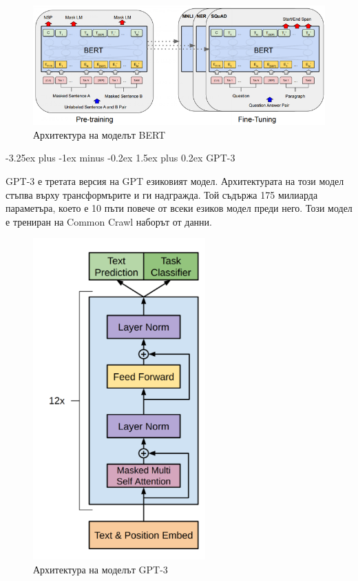 \documentclass{article}
\makeatletter
\renewcommand\paragraph{\@startsection{paragraph}{5}{\z@}%
{3.25ex \@plus1ex \@minus.2ex}%
{-1em}%
{\normalfont\normalsize\bfseries}}
\renewcommand{\paragraph}{\@startsection{paragraph}{4}{0ex}%
{-3.25ex plus -1ex minus -0.2ex}%
{1.5ex plus 0.2ex}%
{\normalfont\normalsize\bfseries}}
\makeatother
\begin{document}
    \begin{figure}[H]
        \centering
        \captionsetup{justification=centering}
        \includegraphics[width=450px, keepaspectratio]{chapter-02/bert.png}
        \caption{Архитектура на моделът BERT}
    \end{figure}

    \paragraph{GPT-3}

    GPT-3 е третата версия на GPT езиковият модел. Архитектурата на този модел стъпва върху трансформърите и ги надгражда.
    Той съдържа 175 милиарда параметъра, което е 10 пъти повече от всеки езиков модел преди него. Този модел е трениран на
    Common Crawl наборът от данни. \cite{gpt-3}

    \begin{figure}[H]
        \centering
        \captionsetup{justification=centering}
        \includegraphics[width=250px, keepaspectratio]{chapter-02/gpt-3.png}
        \caption{Архитектура на моделът GPT-3}
    \end{figure}
\end{document}
